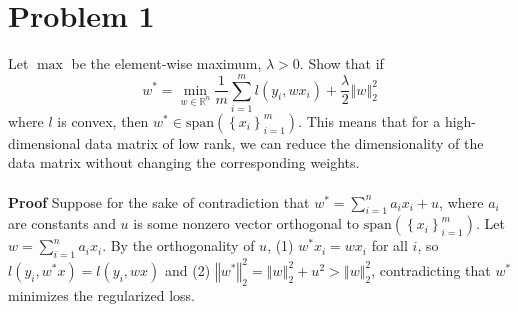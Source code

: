 \documentclass[a4paper,13pt]{article}
\begin{document}
\section*{Problem 1}

Let $\max$ be the element-wise maximum, $\lambda > 0$. Show that if
$$w^* = \min_{w \in \mathbb{R}^n} \frac{1}{m} \sum_{i=1}^m l(y_i, w x_i) + \frac{\lambda}{2} \left\Vert w \right\Vert_2^2$$
where $l$ is convex, then $w^* \in \text{span}(\left\{ x_i \right\}_{i=1}^m)$. This means that for a high-dimensional data matrix of low rank, we can reduce the dimensionality of the data matrix without changing the corresponding weights.
\\\\
\textbf{Proof} Suppose for the sake of contradiction that $w^* = \sum_{i=1}^n a_i x_i + u$, where $a_i$ are constants and $u$ is some nonzero vector orthogonal to $\text{span}(\left\{ x_i \right\}_{i=1}^m)$. Let $w = \sum_{i=1}^n a_i x_i$. By the orthogonality of $u$, (1) $w^* x_i = w x_i$ for all $i$, so $l(y_i, w^* x) = l(y_i, w x)$ and (2) $\left\Vert w^* \right\Vert_2^2 = \left\Vert w \right\Vert_2^2 + u^2 > \left\Vert w \right\Vert_2^2$, contradicting that $w^*$ minimizes the regularized loss.
\end{document}
